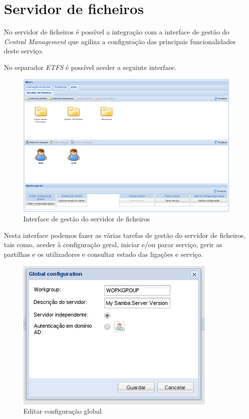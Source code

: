 \section{Servidor de ficheiros}

No servidor de ficheiros é possível a integração com a interface de gestão do \emph{Central Management} que agiliza a configuração das principais funcionalidades deste serviço.

No separador \emph{ETFS} é possível aceder a seguinte interface.

\begin{figure}[H]
    \begin{center}
    \includegraphics[scale=0.38]{screenshots/etfs/etfs_main.png}
    \caption{Interface de gestão do servidor de ficheiros}
    \label{fig:etfs_main}
    \end{center}
\end{figure}

Nesta interface podemos fazer as várias tarefas de gestão do servidor de ficheiros, tais como, aceder à configuração geral, iniciar e/ou parar serviço, gerir as partilhas e os utilizadores e consultar estado das ligações e serviço.

\begin{figure}[H]
    \begin{center}
    \includegraphics[scale=0.38]{screenshots/etfs/etfs_edit_global_config_user.png}
    \caption{Editar configuração global}
    \label{fig:etfs_global_config_user}
    \end{center}
\end{figure}

